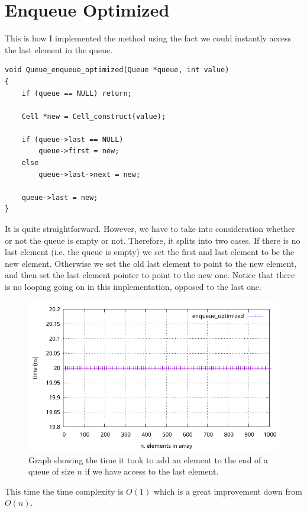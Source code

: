 \documentclass[a4paper, 11pt]{article}
\begin{document}
\section{Enqueue Optimized}
	This is how I implemented the method using the fact we could instantly access the last element in the queue.
	\begin{verbatim}
void Queue_enqueue_optimized(Queue *queue, int value)
{
	if (queue == NULL) return;

	Cell *new = Cell_construct(value);

	if (queue->last == NULL)
		queue->first = new;
	else
		queue->last->next = new;

	queue->last = new;
}
	\end{verbatim}
	It is quite straightforward.
	However, we have to take into consideration whether or not the queue is empty or not.
	Therefore, it splits into two cases.
	If there is no last element (i.e. the queue is empty) we set the first and last element to be the new element.
	Otherwise we set the old last element to point to the new element, and then set the last element pointer to point to the new one.
	Notice that there is no looping going on in this implementation, opposed to the last one.
	\begin{figure}[H]
		\centering
		\includegraphics[scale=0.8]{graphs/enqueue_optimized.pdf}
		\caption{
			Graph showing the time it took to add an element to the end of a queue of size \(n\) if we have access to the last element.
		}
	\end{figure}
	This time the time complexity is \(O(1)\) which is a great improvement down from \(O(n)\).
\end{document}
